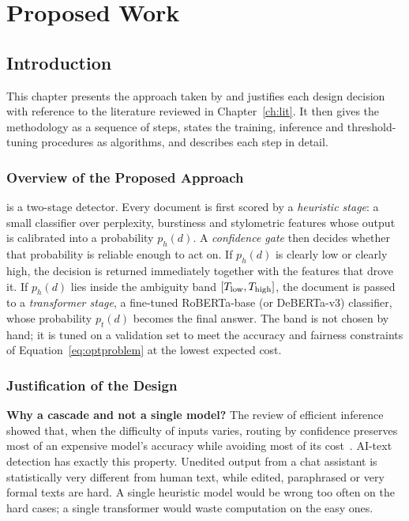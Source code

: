 \chapter{Proposed Work}
\label{ch:proposed}

\section{Introduction}

This chapter presents the approach taken by \veriscript{} and justifies each
design decision with reference to the literature reviewed in
Chapter~\ref{ch:lit}. It then gives the methodology as a sequence of steps,
states the training, inference and threshold-tuning procedures as algorithms,
and describes each step in detail.

\subsection{Overview of the Proposed Approach}

\veriscript{} is a two-stage detector. Every document is first scored by a
\emph{heuristic stage}: a small classifier over perplexity, burstiness and
stylometric features whose output is calibrated into a probability $p_h(d)$.
A \emph{confidence gate} then decides whether that probability is reliable
enough to act on. If $p_h(d)$ is clearly low or clearly high, the decision is
returned immediately together with the features that drove it. If $p_h(d)$
lies inside the ambiguity band $[T_{\mathrm{low}},T_{\mathrm{high}}]$, the document is passed to a
\emph{transformer stage}, a fine-tuned RoBERTa-base (or DeBERTa-v3) classifier,
whose probability $p_t(d)$ becomes the final answer. The band is not chosen
by hand; it is tuned on a validation set to meet the accuracy and fairness
constraints of Equation~\eqref{eq:optproblem} at the lowest expected cost.

\subsection{Justification of the Design}

\textbf{Why a cascade and not a single model?} The review of efficient
inference showed that, when the difficulty of inputs varies, routing by
confidence preserves most of an expensive model's accuracy while avoiding most
of its cost~\cite{viola2001rapid,teerapittayanon2016branchynet,xin2020deebert,
chen2023frugalgpt}. AI-text detection has exactly this property. Unedited
output from a chat assistant is statistically very different from human text,
while edited, paraphrased or very formal texts are hard. A single heuristic
model would be wrong too often on the hard cases; a single transformer would
waste computation on the easy ones.

